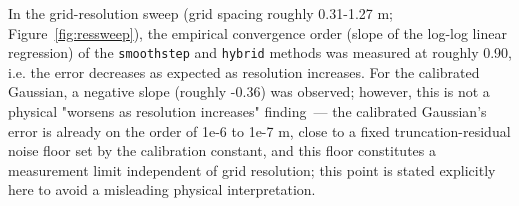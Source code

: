 In the grid-resolution sweep (grid spacing roughly 0.31-1.27 m; Figure~\ref{fig:ressweep}), the empirical convergence order (slope of the log-log linear regression) of the \texttt{smoothstep} and \texttt{hybrid} methods was measured at roughly 0.90, i.e. the error decreases as expected as resolution increases. For the calibrated Gaussian, a negative slope (roughly -0.36) was observed; however, this is not a physical "worsens as resolution increases" finding~--- the calibrated Gaussian's error is already on the order of 1e-6 to 1e-7 m, close to a fixed truncation-residual noise floor set by the calibration constant, and this floor constitutes a measurement limit independent of grid resolution; this point is stated explicitly here to avoid a misleading physical interpretation.
